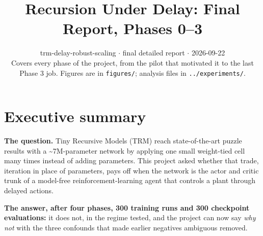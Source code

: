 \documentclass[11pt]{article}
\title{Recursion Under Delay: Final Report, Phases 0--3}
\author{}
\date{trm-delay-robust-scaling $\cdot$ final detailed report $\cdot$ 2026-09-22\\[2pt]Covers every phase of the project, from the pilot that motivated it to the last Phase 3 job. Figures are in \texttt{figures/}; analysis files in \texttt{.\allowbreak{}.\allowbreak{}/\allowbreak{}experiments/\allowbreak{}}.}
\begin{document}
\maketitle
\tableofcontents
\clearpage



\section*{Executive summary}



\textbf{The question.} Tiny Recursive Models (TRM) reach state-of-the-art puzzle results with a \textasciitilde{}7M-parameter network by applying one small weight-tied cell many times instead of adding parameters. This project asked whether that trade, iteration in place of parameters, pays off when the network is the actor and critic trunk of a model-free reinforcement-learning agent that controls a plant through delayed actions.



\textbf{The answer, after four phases, 300 training runs and 300 checkpoint evaluations:} it does not, in the regime tested, and the project can now say \emph{why not} with the three confounds that made earlier negatives ambiguous removed.
\end{document}
